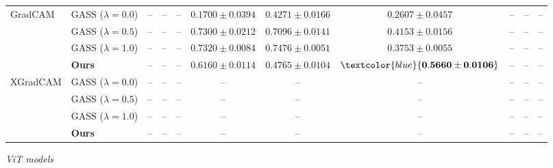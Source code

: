 \begin{table}[t]
{\begin{tabular}{ll|ccc|ccc|ccc}
\multirow{4}{*}{GradCAM}
& GASS ($\lambda=0.0$) & -- & -- & -- & $0.1700 \pm 0.0394$ & $\mathbf{0.4271 \pm 0.0166}$ & $0.2607 \pm 0.0457$ & -- & -- & -- \\
& GASS ($\lambda=0.5$) & -- & -- & -- & $0.7300 \pm 0.0212$ & $0.7096 \pm 0.0141$ & $0.4153 \pm 0.0156$ & -- & -- & -- \\
& GASS ($\lambda=1.0$) & -- & -- & -- & $\mathbf{0.7320 \pm 0.0084}$ & $0.7476 \pm 0.0051$ & $0.3753 \pm 0.0055$ & -- & -- & -- \\
& \textbf{Ours} & -- & -- & -- & $0.6160 \pm 0.0114$ & $0.4765 \pm 0.0104$ & $\textcolor{blue}{\mathbf{0.5660 \pm 0.0106}}$ & -- & -- & -- \\

\midrule
\multirow{4}{*}{XGradCAM}
& GASS ($\lambda=0.0$) & -- & -- & -- & -- & -- & -- & -- & -- & -- \\
& GASS ($\lambda=0.5$) & -- & -- & -- & -- & -- & -- & -- & -- & -- \\
& GASS ($\lambda=1.0$) & -- & -- & -- & -- & -- & -- & -- & -- & -- \\
& \textbf{Ours} & -- & -- & -- & -- & -- & -- & -- & -- & -- \\

\bottomrule
\end{tabular}
}

\vspace{0.5cm}
\textit{ViT models}\\[0.1cm]
\end{table}

